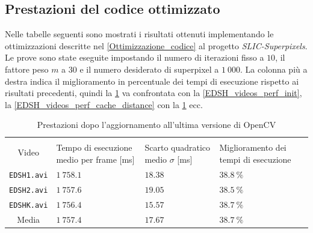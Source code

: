 \documentclass[12pt,a4paper,oneside]{article}
\begin{document}
\subsection{Prestazioni del codice ottimizzato}\label{Risultati_opt}
Nelle tabelle seguenti sono mostrati i risultati ottenuti implementando le ottimizzazioni descritte nel \cref{Ottimizzazione_codice} al progetto \textit{SLIC-Superpixels}. Le prove sono state eseguite impostando il numero di iterazioni fisso a $10$, il fattore peso $m$ a $30$ e il numero desiderato di superpixel a $1~000$. La colonna più a destra indica il miglioramento in percentuale dei tempi di esecuzione rispetto ai risultati precedenti, quindi la \cref{EDSH_videos_perf_new_OpenCV} va confrontata con la \cref{EDSH_videos_perf_init}, la \cref{EDSH_videos_perf_cache_distance} con la \cref{EDSH_videos_perf_new_OpenCV} ecc.
\begin{table}[!htb]
	\renewcommand{\arraystretch}{1.3}
	\centering
	\begin{tabular}{|c||>{\centering\arraybackslash}m{}|>{\centering\arraybackslash}m{}|>{\centering\arraybackslash}m{}|}
	    \hline
		\multirow{2}{*}{\vspace{-6ex}Video}
		& \multicolumn{3}{c|}{VideoSLIC}\\\cline{2-4}
		& Tempo di esecuzione medio per frame [ms] & Scarto quadratico medio $\sigma$ [ms] & Miglioramento dei tempi di esecuzione\\
		\hline\hline
		\texttt{EDSH1.avi} & $1~758.1$ & $18.38$ & $38.8~\%$ \\\hline
		\texttt{EDSH2.avi} & $1~757.6$ & $19.05$ & $38.5~\%$ \\\hline
		\texttt{EDSHK.avi} & $1~756.4$ & $15.57$ & $38.7~\%$ \\\hline\hline
		Media              & $1~757.4$ & $17.67$ & $38.7~\%$ \\\hline
	\end{tabular}
	\captionsetup{justification=centering}
	\caption{Prestazioni dopo l'aggiornamento all'ultima versione di \acrshort{OpenCV}}
	\label{EDSH_videos_perf_new_OpenCV}
\end{table}
\end{document}
